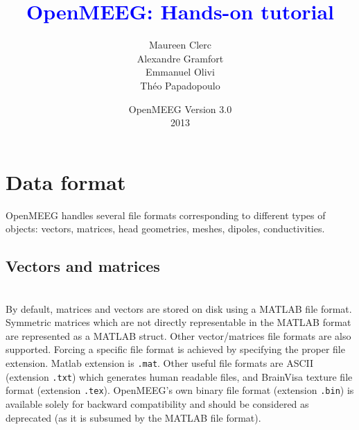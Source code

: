 \documentclass[10pt,journal]{book}
\title{\textbf{\textcolor{blue}{OpenMEEG: Hands-on tutorial}}}
\author{Maureen Clerc\\Alexandre Gramfort \\
        Emmanuel Olivi \\Théo Papadopoulo}
\date{OpenMEEG Version 3.0 \\2013}
\begin{document}
    \maketitle
    \tableofcontents



\chapter{Data format}

OpenMEEG handles several file formats corresponding to different types of objects: vectors, matrices, head geometries, meshes, dipoles, conductivities.

    \section{Vectors and matrices}\mbox{ }\\
    By default, matrices and vectors are stored on disk using a MATLAB file format. Symmetric matrices which are not directly representable in the MATLAB
    format are represented as a MATLAB struct. Other vector/matrices file formats are also supported. Forcing a specific file format is achieved by
    specifying the proper file extension. Matlab extension is {\tt .mat}. Other useful file formats are ASCII (extension {\tt .txt}) which generates
    human readable files, and BrainVisa texture file format (extension {\tt .tex}).
 OpenMEEG's own binary file format (extension {\tt .bin}) is available
    solely for backward compatibility and should be considered as deprecated (as it is subsumed by the MATLAB file format).
\end{document}
